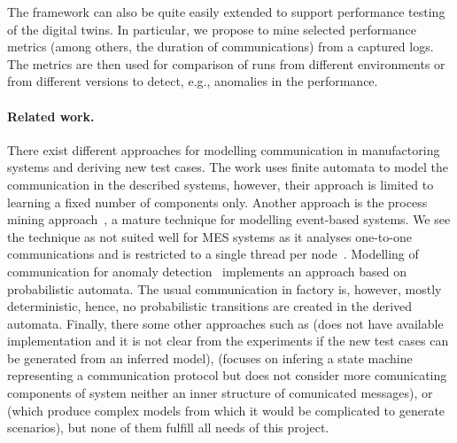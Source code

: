 {%

The framework can also be quite easily extended to support performance
testing of the digital twins.
%
In particular, we propose to mine selected performance metrics (among
others, the duration of communications) from a captured logs.
%
The metrics are then used for comparison of runs from different environments or
from different versions to detect, e.g., anomalies in the performance.
%

\paragraph{Related work.} There exist different approaches for
modelling communication in manufactoring systems and deriving new test cases.
%
The work \cite{csight} uses finite automata to model the communication in the described systems,
however, their approach is limited to learning a fixed number of components only.
%
Another approach is the process mining approach~\cite{procmin}, a mature technique for
modelling event-based systems. We see the technique as not suited well for MES
systems as it analyses one-to-one communications and is restricted to a single
thread per node~\cite{procmindist}.
%
%
Modelling of communication for anomaly detection~\cite{havlena} implements an
approach based on probabilistic automata.  
%
The usual communication in factory is, however, mostly deterministic,
hence, no probabilistic transitions are created in the derived automata.  
%
Finally, there some other approaches such as \cite{wcre09} (does not have available implementation
and it is not clear from the experiments if the new test cases can be generated from an inferred model),
\cite{prospex} (focuses on infering a state machine representing a communication
protocol but does not consider more comunicating components of system neither
an inner structure of comunicated messages),
or \cite{icpn08} (which produce complex models from which it would be complicated to generate scenarios),
but none of them fulfill all needs of this project.

}
